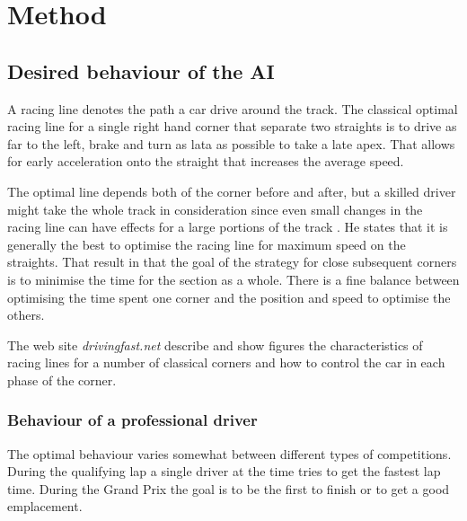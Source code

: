\chapter{Method}


\section{Desired behaviour of the AI}
A racing line denotes the path a car drive around the track. The classical optimal racing line for a single right hand corner that separate two straights is to drive as far to the left, brake and turn as lata as possible to take a late apex\cite{beckman_racing_line_intro}. That allows for early acceleration onto the straight that increases the average speed.

The optimal line depends both of the corner before and after, but a skilled driver might take the whole track in consideration since even small changes in the racing line can have effects for a large portions of the track \cite{beckman_racing_line_intro}. He states that it is generally the best to optimise the racing line for maximum speed on the straights. That result in that the goal of the strategy for close subsequent corners is to minimise the time for the section as a whole. There is a fine balance between optimising the time spent one corner and the position and speed to optimise the others.

The web site \textit{drivingfast.net} describe and show figures the characteristics of racing lines for a number of classical corners and how to control the car in each phase of the corner\cite{driving_fast_racing_line}\cite{driving_fast_corners}.




\subsection{Behaviour of a professional driver}
The optimal behaviour varies somewhat between different types of competitions. During the qualifying lap a single driver at the time tries to get the fastest lap time. During the Grand Prix the goal is to be the first to finish or to get a good emplacement. 

